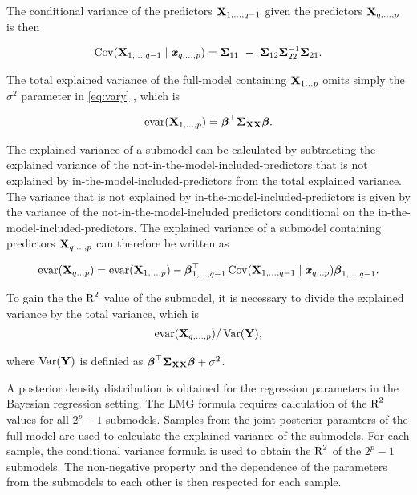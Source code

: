 \documentclass[11pt,a4paper,twoside]{book}
\begin{document}
 The conditional variance of the predictors $ {\mathbf{X}}_{1 ,\dotsc, q-1} $ given the predictors  $ {\mathbf{X}}_{q ,\dotsc, p} $ is then
 
          \begin{align*} 
 \cov(\X_{1,\dotsc, q-1} \mid \x_{q ,\dotsc, p}) = \bSigma_{11}\ -\ \bSigma_{12} \bSigma_{22}^{-1}\bSigma_{21} .
       \end{align*}
       
       The total explained variance of the full-model containing ${\mathbf{X}}_{1 \dots p}$ omits simply the $\sigma^2$ parameter in \eqref{eq:vary} , which is

      \begin{align*} 
        \text{evar}({\mathbf{X}}_{1 ,\dotsc, p}) = {\boldsymbol{\beta}}^\top {\boldsymbol{\Sigma}}{}_{{\mathbf{X}} {\mathbf{X}}}  {\boldsymbol{\beta}}. 
   \end{align*}

The explained variance of a submodel can be calculated by subtracting the explained variance of the not-in-the-model-included-predictors that is not explained by in-the-model-included-predictors from the total explained variance. The variance that is not explained by in-the-model-included-predictors is given by the variance of the not-in-the-model-included predictors conditional on the in-the-model-included-predictors. The explained variance of a submodel containing predictors ${\mathbf{X}}_{q ,\dotsc, p}$ can therefore be written as

       \begin{align} 
       \text{evar}({\mathbf{X}}_{q \dots p}) =  \text{evar}({\mathbf{X}}_{1  ,\dotsc, p}) - {\boldsymbol{\beta}}^\top_{1 ,\dotsc, q-1} \operatorname{Cov}({\mathbf{X}}_{1,\dotsc, {q-1}} \mid {\textbf{\textit{x}}}_{q \dots p}) {\boldsymbol{\beta}}_{1 ,\dotsc, {q-1}} . \label{eq:varsub} 
   \end{align}

To gain the the $\text{R}^2$ value of the submodel, it is necessary to divide the explained variance by the total variance, which is
       \begin{align*} 
\text{evar}({\mathbf{X}}_{q ,\dotsc, p}) / \operatorname{Var}({\mathbf{Y}}),   
\end{align*}

where $\operatorname{Var}({\mathbf{Y}})$ is definied as  ${\boldsymbol{\beta}}^\top {\boldsymbol{\Sigma}}{}_{{\mathbf{X}} {\mathbf{X}}}  {\boldsymbol{\beta}} + \sigma^2$.



A posterior density distribution is obtained for the regression parameters in the Bayesian regression setting. The LMG formula requires calculation of the $\text{R}^2$ values for all $2^p-1$ submodels. Samples from the joint posterior paramters of the full-model are used to calculate the explained variance of the  submodels. For each sample, the  conditional variance formula is used to obtain the $\text{R}^2$ of the $2^p-1$ submodels. The non-negative property and the dependence of the parameters from the submodels to each other is then respected for each sample. 
\end{document}

